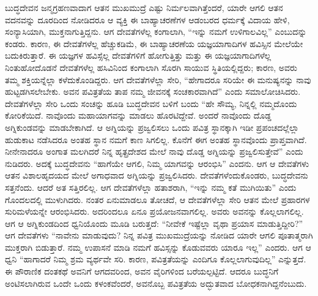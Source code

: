 ಬುದ್ಧದೇವನ ಜನ್ಮಗ್ರಹಣವಾದಾಗ ಆತನ ಮುಖಮುದ್ರೆ ಎಷ್ಟು ನಿರ್ಮಲವಾಗಿತ್ತೆಂದರೆ, ಯಾರೇ ಆಗಲಿ ಆತನ ವದನವನ್ನು ದೂರದಿಂದ ನೋಡಿದರೂ ಆ ವ್ಯಕ್ತಿ ಈ ಬಾಹ್ಯಾಚರಣೆಗಳ ಆಡಂಬರದ ಧರ್ಮಕ್ಕೆ ವಿದಾಯ ಹೇಳಿ, ಸಂನ್ಯಾಸಿಯಾಗಿ, ಮುಕ್ತನಾಗುತ್ತಿದ್ದನು. ಆಗ ದೇವತೆಗಳೆಲ್ಲ ಕಂಗಾಲಾಗಿ, “ಇನ್ನು ನಮಗೆ ಉಳಿಗಾಲವಿಲ್ಲ” ಎಂಬುದನ್ನು ಕಂಡರು. ಕಾರಣ, ಈ ದೇವತೆಗಳೆಲ್ಲ ಹೆಚ್ಚುಕಡಿಮೆ, ಈ ಬಾಹ್ಯಾಚರಣೆಯ ಯಜ್ಞಯಾಗಾದಿಗಳ ಹವಿಸ್ಸಿನ ಮೇಲೆಯೇ ಬದುಕಿರುತ್ತಾರೆ. ಈ ಯಜ್ಞಗಳ ಹವಿಸ್ಸೆಲ್ಲ ದೇವತೆಗಳಿಗೆ ಹೋಗುತ್ತಿತ್ತು ಮತ್ತು ಈ ಯಜ್ಞಯಾಗಾದಿಗಳೆಲ್ಲ ನಿಂತುಹೋದೊಡನೆ ದೇವತೆಗಳೆಲ್ಲ ಹಸಿವಿನಿಂದ ಕಂಗಾಲಾಗಿ ಸೊರಗಿ ಸಾಯುವ ಸ್ಥಿತಿಯಲ್ಲಿದ್ದರು; ಕಾರಣ, ಅವರು ತಮ್ಮ ಶಕ್ತಿಯನ್ನೆಲ್ಲಾ ಕಳೆದುಕೊಂಡಿದ್ದರು. ಆಗ ದೇವತೆಗಳೆಲ್ಲಾ ಸೇರಿ, “ಹೇಗಾದರೂ ಸರಿಯೇ ಈ ಮನುಷ್ಯನನ್ನು ನಾವು ಹುಟ್ಟಡಗಿಸಲೇಬೇಕು. ಅವನ ಪವಿತ್ರತೆಯ ತಾಪ ನಮ್ಮ ಜೀವನಕ್ಕೆ ಸಂಚಕಾರವಾಗಿದೆ” ಎಂದು ಸಮಾಲೋಚಿಸಿದರು. ದೇವತೆಗಳೆಲ್ಲಾ ಸೇರಿ ಒಂದು ಸಂಚನ್ನು ಹೂಡಿ ಬುದ್ಧದೇವನ ಬಳಿಗೆ ಬಂದು “ಹೇ ಸೌಮ್ಯ, ನಿನ್ನಲ್ಲಿ ನಮ್ಮದೊಂದು ಕೋರಿಕೆಯಿದೆ. ನಾವೊಂದು ಮಹಾಯಾಗವನ್ನು ಮಾಡಲು ಹೊರಟಿದ್ದೇವೆ. ಅಂದರೆ ನಾವೊಂದು ದೊಡ್ಡ ಅಗ್ನಿಕುಂಡವನ್ನು ಮಾಡಬೇಕಾಗಿದೆ. ಆ ಅಗ್ನಿಯನ್ನು ಪ್ರಜ್ವಲಿಸಲು ಒಂದು ಪವಿತ್ರ ಸ್ಥಾನಕ್ಕಾಗಿ ಇಡೀ ಪ್ರಪಂಚದಲ್ಲೆಲ್ಲಾ ಹುಡುಕಾಟ ನಡೆಸಿದರೂ ಅಂತಹ ಸ್ಥಾನ ನಮಗೆ ಕಾಣ ಸಿಗಲಿಲ್ಲ. ಕೊನೆಗೆ ಈಗ ಅಂತಹ ಸ್ಥಾನವೊಂದು ಪ್ರಾಪ್ತವಾಗಿದೆ. ನೀನೇನಾದರೂ ಅಂಗಾತ ಮಲಗಿದರೆ ನಿನ್ನ ಹೃತ್ಪ್ರದೇಶದ ಮೇಲೆ ನಾವು ದೊಡ್ಡ ಅಗ್ನಿಯನ್ನು ಪ್ರಜ್ವಲಿಸುತ್ತೇವೆ” ಎಂದು ನುಡಿದರು. ಅದಕ್ಕೆ ಬುದ್ಧದೇವನು “ಹಾಗೆಯೇ ಆಗಲಿ, ನಿಮ್ಮ ಯಾಗವನ್ನು ಆರಂಭಿಸಿ” ಎಂದನು. ಆಗ ಆ ದೇವತೆಗಳು ಆತನ ವಿಶಾಲಹೃದಯದ ಮೇಲೆ ಅಗಾಧವಾದ ಅಗ್ನಿಯನ್ನು ಪ್ರಜ್ವಲಿಸಿದರು. ದೇವತೆಗಳೆಂದುಕೊಂಡರು, ಬುದ್ಧದೇವನು ಸತ್ತನೆಂದು. ಆದರೆ ಅತ ಸತ್ತಿರಲಿಲ್ಲ. ಆಗ ದೇವತೆಗಳೆಲ್ಲಾ ಹತಾಶರಾಗಿ, “ಇನ್ನು ನಮ್ಮ ಕತೆ ಮುಗಿಯಿತು” ಎಂದು ಗೊಂದಲದಲ್ಲಿ ಮುಳುಗಿದರು. ನಂತರ ಏನುಮಾಡಲೂ ತೋಚದೆ, ಆ ದೇವತೆಗಳೆಲ್ಲಾ ಸೇರಿ ಆತನ ಮೇಲೆ ಪ್ರಹಾರಗಳ ಸುರಿಮಳೆಯನ್ನೇ ಆರಂಭಿಸಿದರು. ಅದರಿಂದಲೂ ಏನೂ ಪ್ರಯೋಜನವಾಗಲಿಲ್ಲ. ಅವರು ಅವನನ್ನು ಕೊಲ್ಲಲಾಗಲಿಲ್ಲ. ಆಗ ಆ ಅಗ್ನಿಕುಂಡದಿಂದ ಧ್ವನಿಯೊಂದು ಮೂಡಿ ಬರುತ್ತದೆ: “ನೀವೇಕೆ ಇಷ್ಟೆಲ್ಲಾ ವೃಥಾ ಪ್ರಯಾಸ ಮಾಡುತ್ತಿದ್ದೀರಿ?” ಆಗ ದೇವತೆಗಳು “ನಾವೇನು ಮಾಡುವುದು? ನಿನ್ನ ಪವಿತ್ರ ಮುಖಮುದ್ರೆಯನ್ನು ನೋಡಿದ ಯಾರೇ ಆಗಲಿ ಪೂತಾತ್ಮರಾಗಿ ಮುಕ್ತರಾಗಿ ಬಿಡುತ್ತಾರೆ. ನಮ್ಮ ಉಪಾಸನೆ ಮಾಡಿ ನಮಗೆ ಹವಿಸ್ಸನ್ನು ಕೊಡುವವರು ಯಾರೂ ಇಲ್ಲ” ಎಂದರು. ಆಗ ಆ ಧ್ವನಿ “ಹಾಗಾದರೆ ನಿಮ್ಮ ಶ್ರಮ ವ್ಯರ್ಥವೇ ಸರಿ. ಕಾರಣ, ಪವಿತ್ರತೆಯನ್ನು ಎಂದಿಗೂ ಕೊಲ್ಲಲಾಗುವುದಿಲ್ಲ” ಎನ್ನುತ್ತದೆ. ಈ ಪೌರಾಣಿಕ ದಂತಕಥೆ ಅವನಿಗೆ ಆಗದವರಿಂದ, ಅವನ ವೈರಿಗಳಿಂದ ಬರೆಯಲ್ಪಟ್ಟಿದೆ. ಆದರೂ ಬುದ್ಧನಿಗೆ ಅಂಟಿಸಲಾಗಿರುವ ಒಂದೇ ಒಂದು ಕಳಂಕವೆಂದರೆ, ಅವನೊಬ್ಬ ಪವಿತ್ರತೆಯ ಅದ್ಭುತವಾದ ಬೋಧಕನಾಗಿದ್ದನೆಂಬುದು.

